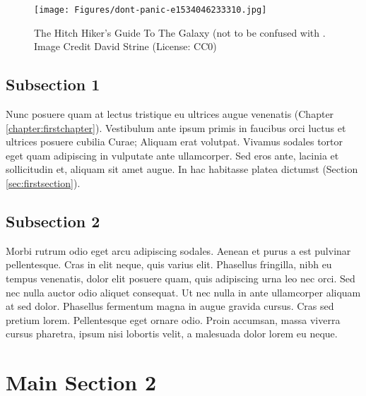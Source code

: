 \begin{figure}
\begin{centering}
\texttt{[image: Figures/dont-panic-e1534046233310.jpg]}
\caption{The Hitch Hiker's Guide To The Galaxy (not to be confused with \cite{Reference1}. Image Credit David Strine (License: CC0)}
\label{fig:ThisFig}
\end{centering}
\end{figure}

\subsection{Subsection 1}

Nunc posuere quam at lectus tristique eu ultrices augue venenatis (Chapter \ref{chapter:firstchapter}).
Vestibulum ante ipsum primis in faucibus orci luctus et ultrices posuere cubilia Curae; Aliquam erat volutpat.
Vivamus sodales tortor eget quam adipiscing in vulputate ante ullamcorper.
Sed eros ante, lacinia et sollicitudin et, aliquam sit amet augue.
In hac habitasse platea dictumst (Section \ref{sec:firstsection}).


\subsection{Subsection 2}
Morbi rutrum odio eget arcu adipiscing sodales.
Aenean et purus a est pulvinar pellentesque.
 Cras in elit neque, quis varius elit.
 Phasellus fringilla, nibh eu tempus venenatis, dolor elit posuere quam, quis adipiscing urna leo nec orci.
 Sed nec nulla auctor odio aliquet consequat.
 Ut nec nulla in ante ullamcorper aliquam at sed dolor.
 Phasellus fermentum magna in augue gravida cursus.
 Cras sed pretium lorem.
 Pellentesque eget ornare odio.
 Proin accumsan, massa viverra cursus pharetra, ipsum nisi lobortis velit, a malesuada dolor lorem eu neque.


\section{Main Section 2}

